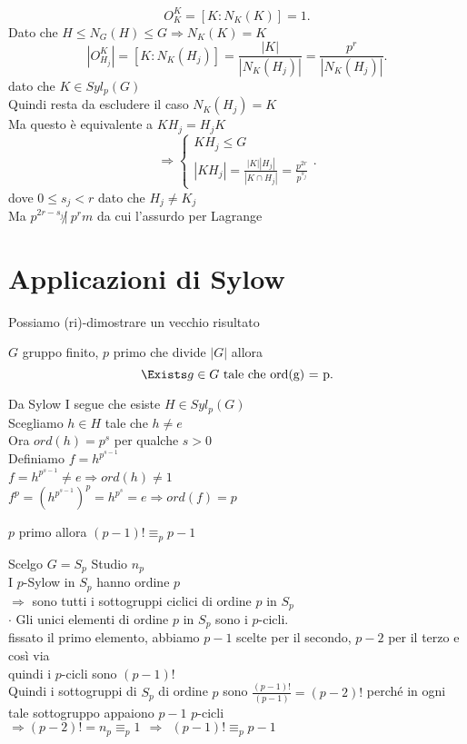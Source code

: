 \documentclass[12px]{article}
\begin{document}
\begin{dimo}
	  \[
		  O_K^K = [K:N_K(K)] = 1
	 .\] 
	 Dato che $H\leq N_G(H)\leq G \Rightarrow N_K(K) = K$ 
	 \[
		 |O_{H_j}^K| = [K:N_K(H_j)] = \frac {|K|}{|N_K(H_{j})|} = \frac {p^r}{|N_K(H_j)|}
	 .\] 
	 dato che $K \in Syl_p(G)$\\
	 Quindi resta da escludere il caso  $N_K(H_j) = K$\\
	 Ma questo è equivalente a  $KH_j = H_j K$ 
	 \[
	 \Rightarrow \begin{cases}
	 	KH_j\leq G\\
		|KH_j| = \frac { |K||H_j|}{|K\cap H_j|} = \frac{p^{2r}}{p^{s_j}}
	 \end{cases}
	 .\] 
	 dove $0\leq s_j < r$ dato che  $H_j\neq K_j$\\
	 Ma  $p^{2r-s_j}\not | \ p^rm$ da cui l'assurdo per Lagrange
	\end{dimo}
	\section{Applicazioni di Sylow}
	Possiamo (ri)-dimostrare un vecchio risultato
	\begin{teo}[Cauchy]
		$G$ gruppo finito, $p$ primo che divide $|G|$ allora\\
		 \[
			 \Exists g\in G\text{ tale che } $ord(g) = p$
		.\] 
		
	\end{teo}
	\begin{dimo}
		Da Sylow I segue che esiste $H\in Syl_p(G)$ \\
		Scegliamo $h\in H$ tale che  $h\neq e$\\
		Ora  $ord(h) = p^s$ per qualche $s>0$\\
		Definiamo $f = h^{p^{s-1}}$\\
		 $f = h^{p^{s-1}}\neq e \Rightarrow ord(h)\neq 1$ \\
		 $f^p = (h^{p^{s-1}})^p = h^{p^s} = e \Rightarrow ord(f) = p$
	\end{dimo}
	\begin{teo}[Wilson]
		$p$ primo allora $(p-1)!\equiv_p p-1$
	\end{teo}
	\begin{dimo}
		Scelgo $G= S_p$ Studio $n_p$\\
		I  $p$-Sylow in $S_p$ hanno ordine $p$\\
		 $ \Rightarrow$ sono tutti i sottogruppi ciclici di ordine $p$ in $S_p$\\
		 $\cdot$ Gli unici elementi di ordine  $p$ in $S_p$ sono i $p$-cicli.\\
		 fissato il primo elemento, abbiamo $p-1$ scelte per il secondo, $p-2$ per il terzo e così via\\
		 quindi i $p$-cicli sono $ (p-1)!$\\
		 Quindi i sottogruppi di $S_p$ di ordine $p$ sono $\frac{(p-1)!}{(p-1)} = (p-2)!$ perché in ogni tale sottogruppo appaiono  $p-1$ $p$-cicli\\
		 $ \Rightarrow (p-2)! = n_p \equiv_p 1 \ \ \Rightarrow \ \ (p-1)! \equiv_p p-1$
	\end{dimo}
\end{document}

